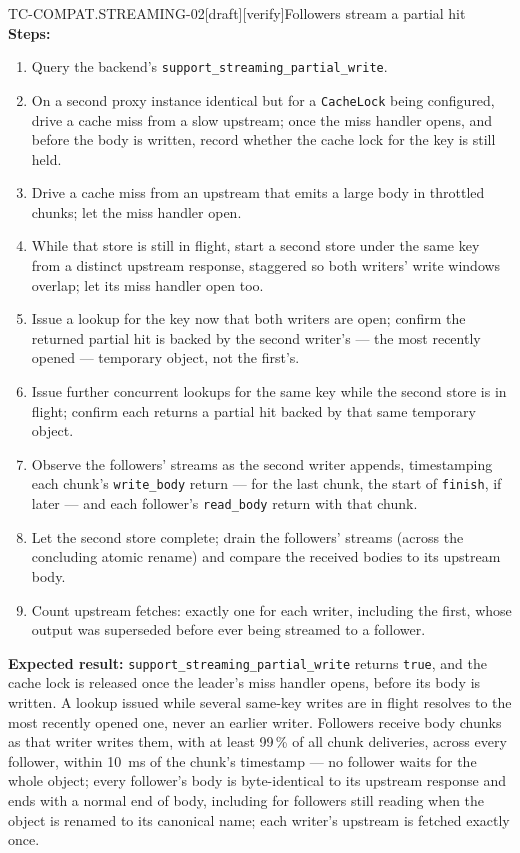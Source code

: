 \begin{requirement}{TC-COMPAT.STREAMING-02}[draft][verify]{Followers stream a partial hit}
  \textbf{Steps:}
  \begin{enumerate}
    \item Query the backend's \texttt{support\_streaming\_partial\_write}.
    \item On a second proxy instance identical but for a \texttt{CacheLock}
      being configured, drive a cache miss from a slow upstream; once the
      miss handler opens, and before the body is written, record whether
      the cache lock for the key is still held.
    \item Drive a cache miss from an upstream that emits a large body in
      throttled chunks; let the miss handler open.
    \item While that store is still in flight, start a second store under
      the same key from a distinct upstream response, staggered so both
      writers' write windows overlap; let its miss handler open too.
    \item Issue a lookup for the key now that both writers are open; confirm
      the returned partial hit is backed by the second writer's --- the most
      recently opened --- temporary object, not the first's.
    \item Issue further concurrent lookups for the same key while the second
      store is in flight; confirm each returns a partial hit backed by that
      same temporary object.
    \item Observe the followers' streams as the second writer appends,
      timestamping each chunk's \texttt{write\_body} return --- for the
      last chunk, the start of \texttt{finish}, if later --- and each
      follower's \texttt{read\_body} return with that chunk.
    \item Let the second store complete; drain the followers' streams
      (across the concluding atomic rename) and compare the received bodies
      to its upstream body.
    \item Count upstream fetches: exactly one for each writer, including the
      first, whose output was superseded before ever being streamed to a
      follower.
  \end{enumerate}

  \textbf{Expected result:} \texttt{support\_streaming\_partial\_write}
  returns \texttt{true}, and the cache lock is released once the leader's
  miss handler opens, before its body is written. A lookup issued while
  several same-key writes are in flight resolves to the most recently opened one, never an earlier
  writer. Followers receive body chunks as that writer writes them, with at
  least 99\,\% of all chunk deliveries, across every follower, within 10~ms
  of the chunk's timestamp --- no follower waits for the whole object;
  every follower's body is
  byte-identical to its upstream response and ends with a normal end of
  body, including for followers still reading when the object is renamed to
  its canonical name; each writer's upstream is fetched exactly
  once.


\end{requirement}
